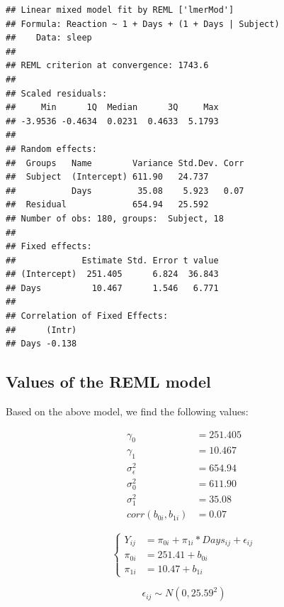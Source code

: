 \documentclass[
]{article}
\begin{document}
\begin{verbatim}
## Linear mixed model fit by REML ['lmerMod']
## Formula: Reaction ~ 1 + Days + (1 + Days | Subject)
##    Data: sleep
## 
## REML criterion at convergence: 1743.6
## 
## Scaled residuals: 
##     Min      1Q  Median      3Q     Max 
## -3.9536 -0.4634  0.0231  0.4633  5.1793 
## 
## Random effects:
##  Groups   Name        Variance Std.Dev. Corr
##  Subject  (Intercept) 611.90   24.737       
##           Days         35.08    5.923   0.07
##  Residual             654.94   25.592       
## Number of obs: 180, groups:  Subject, 18
## 
## Fixed effects:
##             Estimate Std. Error t value
## (Intercept)  251.405      6.824  36.843
## Days          10.467      1.546   6.771
## 
## Correlation of Fixed Effects:
##      (Intr)
## Days -0.138
\end{verbatim}

\hypertarget{values-of-the-reml-model}{%
\subsection{Values of the REML model}\label{values-of-the-reml-model}}

Based on the above model, we find the following values:

\[\begin{aligned}
\gamma_{0}  &= 251.405 \\
\gamma_{1}  &= 10.467  \\
\sigma_{\epsilon}^{2} &= 654.94 \\
\sigma_{0}^{2} &= 611.90 \\
\sigma_{1}^{2} &= 35.08 \\
corr(b_{0i}, b_{1i}) &= 0.07
\end{aligned}\]

\[
\begin{cases}
Y_{ij}   &= \pi_{0i} + \pi_{1i}* Days_{ij} + \epsilon_{ij} \\
\pi_{0i} &= 251.41 + b_{0i} \\
\pi_{1i} &= 10.47 + b_{1i}
\end{cases}
\]

\[\epsilon_{ij} \sim N(0,25.59^2)\]
\end{document}
